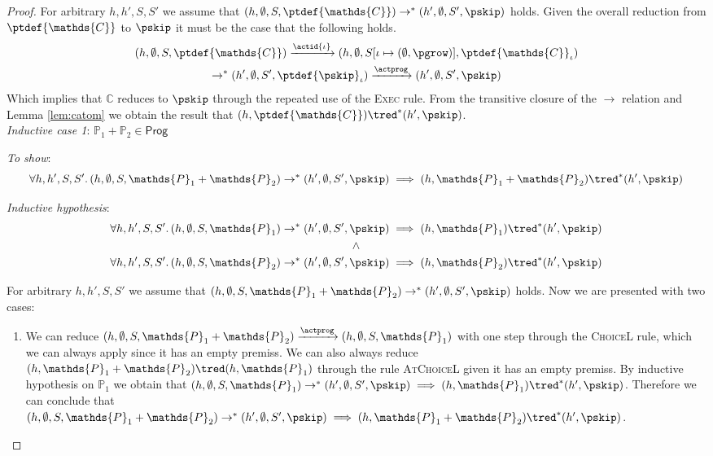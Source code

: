 \begin{thm}
{\begin{proof}
For arbitrary $h, h', S, S'$ we assume that $(h, \emptyset, S, \ptdef{\mathds{C}}) \rightarrow^* (h', \emptyset, S', \pskip)$ holds. Given the overall reduction from $\ptdef{\mathds{C}}$ to $\pskip$ it must be the case that the following holds.
\begin{gather*}
	(h, \emptyset, S, \ptdef{\mathds{C}})
	\xrightarrow{\actid{\iota}} (h, \emptyset, S[\iota \mapsto (\emptyset, \pgrow)], \ptdef{\mathds{C}}_\iota) \\
	\rightarrow^* (h', \emptyset, S', \ptdef{\pskip}_\iota)
	\xrightarrow{\actprog} (h', \emptyset, S', \pskip)
\end{gather*}
Which implies that $\mathds{C}$ reduces to $\pskip$ through the repeated use of the \textsc{Exec} rule. From the transitive closure of the $\rightarrow$ relation and Lemma \ref{lem:catom} we obtain the result that $(h, \ptdef{\mathds{C}}) \tred^* (h', \pskip)$. \\
\indline
\textit{Inductive case 1}: $\mathds{P}_1 + \mathds{P}_2 \in \mathsf{Prog}$

\textit{To show}:
\[
	\forall h, h', S, S' \ldotp
	(h, \emptyset, S, \mathds{P}_1 + \mathds{P}_2) \rightarrow^* (h', \emptyset, S', \pskip) \implies 
	(h, \mathds{P}_1 + \mathds{P}_2 ) \tred^* (h', \pskip)
\]

\textit{Inductive hypothesis}:
\begin{gather*}
	\forall h, h', S, S' \ldotp
	(h, \emptyset, S, \mathds{P}_1) \rightarrow^* (h', \emptyset, S', \pskip) \implies 
	(h, \mathds{P}_1) \tred^* (h', \pskip)
	\\ \land \\
	\forall h, h', S, S' \ldotp
	(h, \emptyset, S, \mathds{P}_2) \rightarrow^* (h', \emptyset, S', \pskip) \implies 
	(h, \mathds{P}_2) \tred^* (h', \pskip)
\end{gather*}

For arbitrary $h, h', S, S'$ we assume that $(h, \emptyset, S, \mathds{P}_1 + \mathds{P}_2) \rightarrow^* (h', \emptyset, S', \pskip)$ holds. Now we are presented with two cases:
\begin{enumerate}
	\item We can reduce $(h, \emptyset, S, \mathds{P}_1 + \mathds{P}_2) \xrightarrow{\actprog} (h, \emptyset, S, \mathds{P}_1)$ with one step through the \textsc{ChoiceL} rule, which we can always apply since it has an empty premiss. We can also always reduce $(h, \mathds{P}_1 + \mathds{P}_2) \tred (h, \mathds{P}_1)$ through the rule \textsc{AtChoiceL} given it has an empty premiss. By inductive hypothesis on $\mathds{P}_1$ we obtain that $(h, \emptyset, S, \mathds{P}_1) \rightarrow^* (h', \emptyset, S', \pskip) \implies (h, \mathds{P}_1) \tred^* (h', \pskip)$. Therefore we can conclude that $(h, \emptyset, S, \mathds{P}_1 + \mathds{P}_2) \rightarrow^* (h', \emptyset, S', \pskip) \implies  (h, \mathds{P}_1 + \mathds{P}_2) \tred^* (h', \pskip)$.
	

\end{enumerate}
\end{proof}}
\end{thm}
